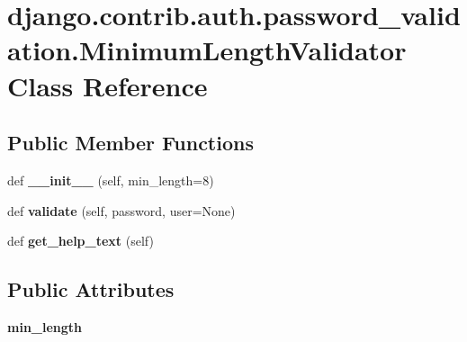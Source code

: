 \hypertarget{classdjango_1_1contrib_1_1auth_1_1password__validation_1_1_minimum_length_validator}{}\section{django.\+contrib.\+auth.\+password\+\_\+validation.\+Minimum\+Length\+Validator Class Reference}
\label{classdjango_1_1contrib_1_1auth_1_1password__validation_1_1_minimum_length_validator}
\subsection*{Public Member Functions}
\begin{DoxyCompactItemize}
\item 
\mbox{\label{classdjango_1_1contrib_1_1auth_1_1password__validation_1_1_minimum_length_validator_a94732e436014d26644b43eceaf9becb4}} 
def {\bfseries \+\_\+\+\_\+init\+\_\+\+\_\+} (self, min\+\_\+length=8)
\item 
\mbox{\label{classdjango_1_1contrib_1_1auth_1_1password__validation_1_1_minimum_length_validator_a3ed333617cb21889cb559a14fde2f085}} 
def {\bfseries validate} (self, password, user=None)
\item 
\mbox{\label{classdjango_1_1contrib_1_1auth_1_1password__validation_1_1_minimum_length_validator_af7cd422e0ff4a092e29733edfeced157}} 
def {\bfseries get\+\_\+help\+\_\+text} (self)
\end{DoxyCompactItemize}
\subsection*{Public Attributes}
\begin{DoxyCompactItemize}
\item 
\mbox{\label{classdjango_1_1contrib_1_1auth_1_1password__validation_1_1_minimum_length_validator_af93a9aa08f87b3873ead83b6902395a8}} 
{\bfseries min\+\_\+length}
\end{DoxyCompactItemize}


